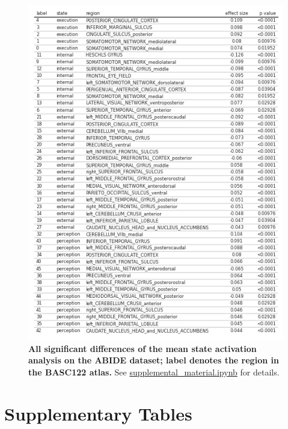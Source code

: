 \documentclass{article}
\begin{document}
\begin{figure}[!htbp]
\centering
\includegraphics[width=0.7\linewidth]{files/clinical_results_tab-815524b057248640a940b2e9b5a7e057.png}
\caption[]{\textbf{All significant differences of the mean state activation analysis on the ABIDE dataset; label denotes the region
in the BASC122 atlas.} See \href{https://github.com/pni-lab/connattractor/blob/master/notebooks/supplemental\_material.ipynb}{supplemental\_material.ipynb} for details.}
\label{si_clinical_results_table}
\end{figure}

\section{Supplementary Tables}
\end{document}
